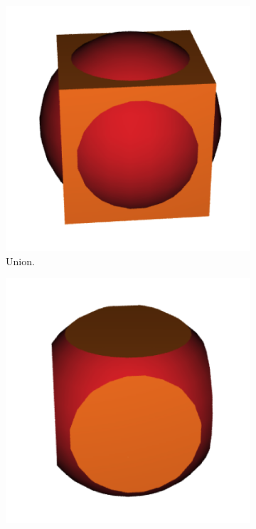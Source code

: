 \documentclass[a4paper,11pt,oneside]{article}
\begin{document}
\begin{figure}[ht]
     \centering
     \begin{subfigure}[b]{0.3\textwidth}
         \centering
         \includegraphics[width=\textwidth]{section1/union.png}
         \caption{Union.}
         \label{sec1:union}
     \end{subfigure}
     \hfill
     \begin{subfigure}[b]{0.3\textwidth}
         \centering
         \includegraphics[width=\textwidth]{section1/intersection.png}

\end{subfigure}
\end{figure}
\end{document}
